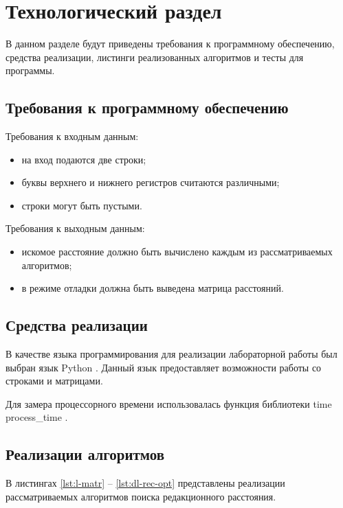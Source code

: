 \section{Технологический раздел \hfill}
\vspace{\baselineskip}

В данном разделе будут приведены требования к программному обеспечению, средства реализации, листинги реализованных алгоритмов и тесты для программы.

\subsection{Требования к программному обеспечению}

Требования к входным данным:
\begin{itemize}
	\item на вход подаются две строки;
	\item буквы верхнего и нижнего регистров считаются различными;
	\item строки могут быть пустыми.
\end{itemize}

Требования к выходным данным:
\begin{itemize}
	\item искомое расстояние должно быть вычислено каждым из рассматриваемых алгоритмов;
	\item в режиме отладки должна быть выведена матрица расстояний.
\end{itemize}

\subsection{Средства реализации}

В качестве языка программирования для реализации лабораторной работы был выбран язык Python \cite{PythonBook}. Данный язык предоставляет возможности работы со строками и матрицами.

Для замера процессорного времени использовалась функция библиотеки time process\_time \cite{process_time_text}.


\subsection{Реализации алгоритмов}
В листингах \ref{lst:l-matr} -- \ref{lst:dl-rec-opt} представлены реализации рассматриваемых алгоритмов поиска редакционного расстояния. 
\clearpage


